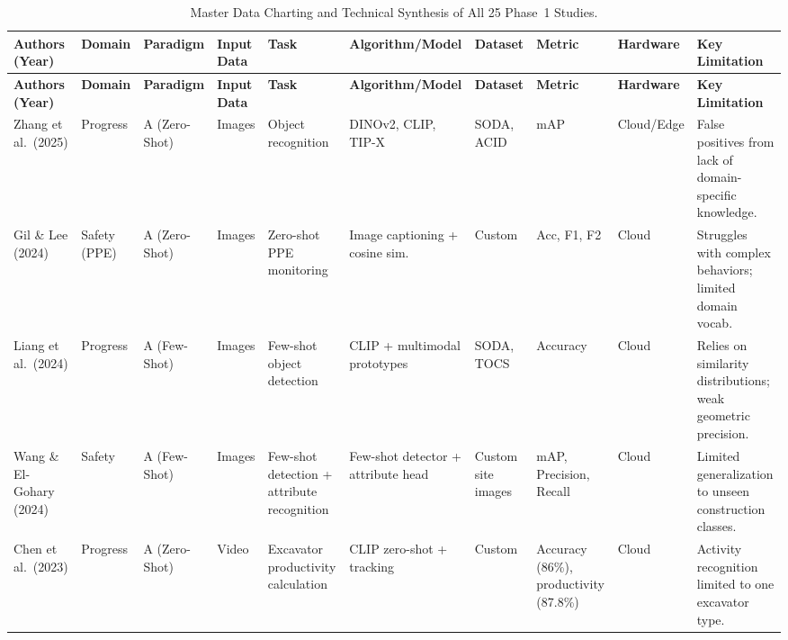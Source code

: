 \documentclass[10pt,letterpaper]{article}
\begin{document}
\begin{landscape}
\small
{}
\begin{longtable}{L{2.8cm} L{1.7cm} L{2.0cm} L{2.5cm} L{1.5cm} L{3.0cm} L{1.8cm} L{2.0cm} L{1.6cm} L{3.2cm}}
\caption{Master Data Charting and Technical Synthesis of All 25 Phase~1 Studies.}
\label{tab:master}\\
\toprule
{}
\textbf{Authors (Year)} & \textbf{Domain} & \textbf{Paradigm} & \textbf{Input Data} & \textbf{Task} & \textbf{Algorithm/Model} & \textbf{Dataset} & \textbf{Metric} & \textbf{Hardware} & \textbf{Key Limitation}\\
\midrule
\endfirsthead
\toprule
{}
\textbf{Authors (Year)} & \textbf{Domain} & \textbf{Paradigm} & \textbf{Input Data} & \textbf{Task} & \textbf{Algorithm/Model} & \textbf{Dataset} & \textbf{Metric} & \textbf{Hardware} & \textbf{Key Limitation}\\
\midrule
\endhead
\midrule
\endfoot
\bottomrule
\endlastfoot

Zhang et al.\ (2025) & Progress & A (Zero-Shot) & Images & Object recognition & DINOv2, CLIP, TIP-X & SODA, ACID & mAP & Cloud/Edge & False positives from lack of domain-specific knowledge.\\

Gil \& Lee (2024) & Safety (PPE) & A (Zero-Shot) & Images & Zero-shot PPE monitoring & Image captioning + cosine sim. & Custom & Acc, F1, F2 & Cloud & Struggles with complex behaviors; limited domain vocab.\\

Liang et al.\ (2024) & Progress & A (Few-Shot) & Images & Few-shot object detection & CLIP + multimodal prototypes & SODA, TOCS & Accuracy & Cloud & Relies on similarity distributions; weak geometric precision.\\

Wang \& El-Gohary (2024) & Safety & A (Few-Shot) & Images & Few-shot detection + attribute recognition & Few-shot detector + attribute head & Custom site images & mAP, Precision, Recall & Cloud & Limited generalization to unseen construction classes.\\

Chen et al.\ (2023) & Progress & A (Zero-Shot) & Video & Excavator productivity calculation & CLIP zero-shot + tracking & Custom & Accuracy (86\%), productivity (87.8\%) & Cloud & Activity recognition limited to one excavator type.\\


\end{longtable}
\end{landscape}
\end{document}
